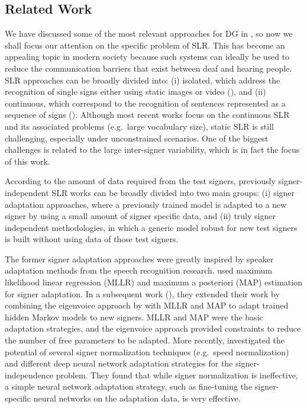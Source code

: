 \subsection{Related Work}
\label{sec:adv_signer_inv_rel_work}
We have discussed some of the most relevant approaches for DG in , so now we shall focus our attention on the specific problem of SLR. This has become an appealing topic in modern society because such systems can ideally be used to reduce the communication barriers that exist between deaf and hearing people.
SLR approaches can be broadly divided into: (i) isolated, which address the recognition of single signs either using static images or video (\citet{Marin2014, Marin2016}), and (ii) continuous, which correspond to the recognition of sentences represented as a sequence of signs (\citet{DanGuo2017, DanGuo2018, Wang2018}). Although most recent works focus on the continuous SLR and its associated problems (e.g.\ large vocabulary size), static SLR is still challenging, especially under unconstrained scenarios. One of the biggest challenges is related to the large inter-signer variability, which is in fact the focus of this work.

According to the amount of data required from the test signers, previously signer-independent SLR works can be broadly divided into two main groups: (i) signer adaptation approaches, where a previously trained model is adapted to a new signer by using a small amount of signer specific data, and (ii) truly signer independent methodologies, in which a generic model robust for new test signers is built without using data of those test signers.

The former signer adaptation approaches were greatly inspired by speaker adaptation methods from the speech recognition research. \citet{Agris2006} used maximum likelihood linear regression (MLLR) and maximum a posteriori (MAP) estimation for signer adaptation. In a subsequent work (\citet{Agris2008a}), they extended their work by combining the eigenvoice approach by \citet{Kuhn2000} with MLLR and MAP to adapt trained hidden Markov models to new signers. MLLR and MAP were the basic adaptation strategies, and the eigenvoice approach provided constraints to reduce the number of free parameters to be adapted. More recently, \citet{Kim2016} investigated the potential of several signer normalization techniques (e.g.\ speed normalization) and different deep neural network adaptation strategies for the signer-independence problem. They found that while signer normalization is ineffective, a simple neural network adaptation strategy, such as fine-tuning the signer-specific neural networks on the adaptation data, is very effective.

